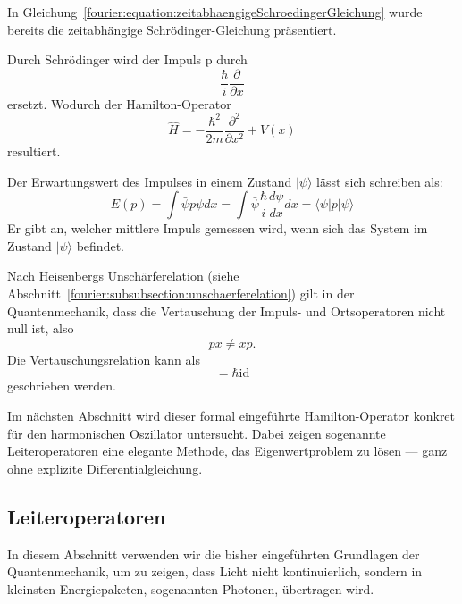 In Gleichung~\ref{fourier:equation:zeitabhaengigeSchroedingerGleichung} wurde bereits die zeitabhängige Schrödinger-Gleichung präsentiert. %


Durch Schrödinger wird der Impuls p durch
\begin{equation}
	\frac{\hbar}{i} \frac{\partial}{\partial x}
\end{equation}
ersetzt.
Wodurch der Hamilton-Operator
\begin{equation}
	\hat{H} = -\frac{\hbar^2}{2m}\frac{\partial^2}{\partial x^2} + V(x)
\end{equation}	
resultiert.

Der Erwartungswert des Impulses in einem Zustand $|\psi\rangle$ lässt sich schreiben als:
\begin{equation}
	E(p) = \int \bar{\psi}p\psi dx
	= \int \bar{\psi} \frac{\hbar}{i} \frac{d\psi}{dx} dx
	= \langle \psi | p | \psi \rangle
\end{equation}
Er gibt an, welcher mittlere Impuls gemessen wird, wenn sich das System im Zustand $|\psi\rangle$ befindet.

Nach Heisenbergs Unschärferelation (siehe Abschnitt~\ref{fourier:subsubsection:unschaerferelation}) gilt in der Quantenmechanik, dass die Vertauschung der Impuls- und Ortsoperatoren nicht null ist, also
\begin{equation}
	px \neq xp.
\end{equation}
Die Vertauschungsrelation kann als
\begin{equation}
	[x, p] = \hbar \text{id}
\end{equation}
geschrieben werden.


		Im nächsten Abschnitt wird dieser formal eingeführte Hamilton-Operator konkret für den harmonischen Oszillator untersucht.
		Dabei zeigen sogenannte Leiteroperatoren eine elegante Methode, das Eigenwertproblem zu lösen — ganz ohne explizite Differentialgleichung.

	\subsection{Leiteroperatoren\label{fourier:subsection:Leiteroperatoren}} %
In diesem Abschnitt verwenden wir die bisher eingeführten Grundlagen der Quantenmechanik, um zu zeigen, dass Licht nicht kontinuierlich, sondern in kleinsten Energiepaketen, sogenannten Photonen, übertragen wird.

